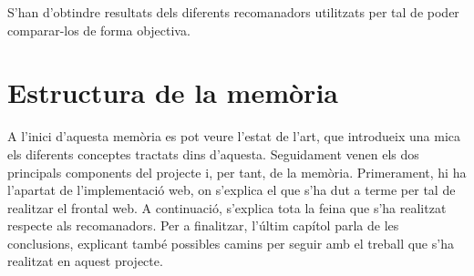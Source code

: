 S'han d'obtindre resultats dels diferents recomanadors utilitzats per tal de poder comparar-los de forma objectiva.

\section{Estructura de la memòria}

A l'inici d'aquesta memòria es pot veure l'estat de l'art, que introdueix una mica els diferents conceptes tractats dins d'aquesta. Seguidament venen els dos principals components del projecte i, per tant, de la memòria. Primerament, hi ha l'apartat de l'implementació web, on s'explica el que s'ha dut a terme per tal de realitzar el frontal web. A continuació, s'explica tota la feina que s'ha realitzat respecte als recomanadors. Per a finalitzar, l'últim capítol parla de les conclusions, explicant també possibles camins per seguir amb el treball que s'ha realitzat en aquest projecte.